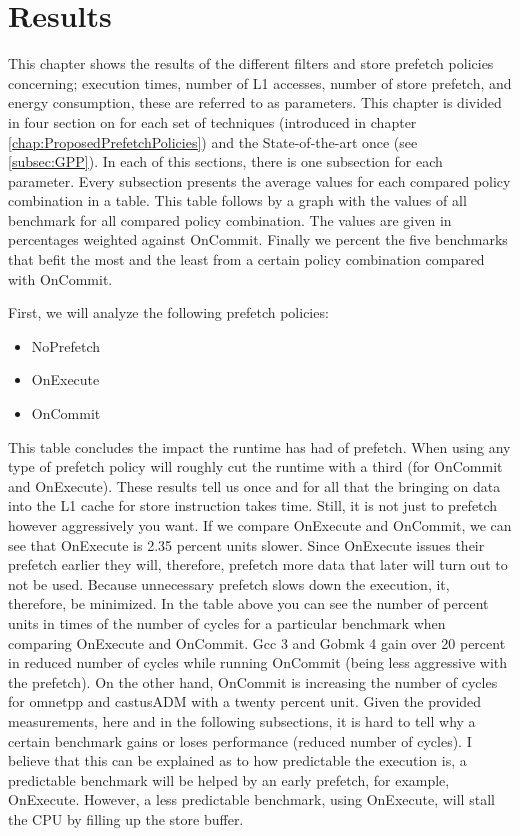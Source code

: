 \chapter{Results}
\label{chap:results}
This chapter shows the results of the different filters and store prefetch policies concerning; execution times, number of L1 accesses, number of store prefetch, and energy consumption, these are referred to as parameters. This chapter is divided in four section on for each set of techniques (introduced in chapter \ref{chap:ProposedPrefetchPolicies}) and the State-of-the-art once (see \ref{subsec:GPP}). In each of this sections, there is one subsection for each parameter. Every subsection presents the average values for each compared policy combination in a table. This table follows by a graph with the values of all benchmark for all compared policy combination. The values are given in percentages weighted against OnCommit. Finally we percent the five benchmarks that befit the most and the least from a certain policy combination compared with OnCommit. 

First, we will analyze the following prefetch policies:
\begin{itemize}
    \item NoPrefetch
    \item OnExecute
    \item OnCommit
\end{itemize}
\resExtime
{}
This table concludes the impact the runtime has had of prefetch. When using any type of prefetch policy will roughly cut the runtime with a third (for OnCommit and OnExecute). These results tell us once and for all that the bringing on data into the L1 cache for store instruction takes time. Still, it is not just to prefetch however aggressively you want. If we compare OnExecute and OnCommit, we can see that OnExecute is 2.35 percent units slower. Since OnExecute issues their prefetch earlier they will, therefore, prefetch more data that later will turn out to not be used. Because unnecessary prefetch slows down the execution, it, therefore, be minimized.
In the table above you can see the number of percent units in times of the number of cycles for a particular benchmark when comparing OnExecute and OnCommit. Gcc 3 and Gobmk 4 gain over 20 percent in reduced number of cycles while running OnCommit (being less aggressive with the prefetch). On the other hand, OnCommit is increasing the number of cycles for omnetpp and castusADM with a twenty percent unit. Given the provided measurements, here and in the following subsections, it is hard to tell why a certain benchmark gains or loses performance (reduced number of cycles). I believe that this can be explained as to how predictable the execution is, a predictable benchmark will be helped by an early prefetch, for example, OnExecute. However, a less predictable benchmark, using OnExecute, will stall the CPU by filling up the store buffer.
\resAcc

